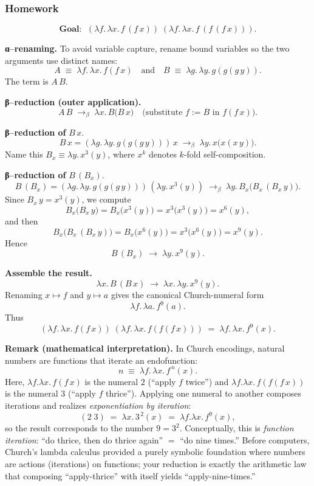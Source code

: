 \documentclass{article}
\theoremstyle{theorem}
\theoremstyle{definition}
\theoremstyle{remark}
\begin{document}
\subsubsection{Homework}

\[
\textbf{Goal: }\;(\lambda f.\,\lambda x.\, f\,(f\,x))\;(\lambda f.\,\lambda x.\, f\,(f\,(f\,x))).
\]

\textbf{α–renaming.}
To avoid variable capture, rename bound variables so the two arguments use distinct names:
\[
A \;\equiv\; \lambda f.\,\lambda x.\, f(f\,x)
\quad\text{and}\quad
B \;\equiv\; \lambda g.\,\lambda y.\, g(g(g\,y)).
\]
The term is \(A\,B\).

\medskip
\textbf{β–reduction (outer application).}
\[
A\,B
\;\to_\beta\;
\lambda x.\, B\bigl(B\,x\bigr)
\quad
\text{(substitute } f := B \text{ in } f(f\,x)).
\]

\medskip
\textbf{β–reduction of } \(B\,x\).
\[
B\,x
=
(\lambda g.\,\lambda y.\, g(g(g\,y)))\,x
\;\to_\beta\;
\lambda y.\, x\bigl(x(x\,y)\bigr).
\]
Name this \(B_x \equiv \lambda y.\, x^3(y)\), where \(x^k\) denotes \(k\)-fold self-composition.

\medskip
\textbf{β–reduction of } \(B\,(B_x)\).
\[
B\,(B_x)
=
(\lambda g.\,\lambda y.\, g(g(g\,y)))\,(\lambda y.\,x^3(y))
\;\to_\beta\;
\lambda y.\, B_x\bigl(B_x\,(B_x\,y)\bigr).
\]
Since \(B_x\,y = x^3(y)\), we compute
\[
B_x\bigl(B_x\,y\bigr) = B_x\bigl(x^3(y)\bigr) = x^3\!\bigl(x^3(y)\bigr) = x^6(y),
\]
and then
\[
B_x\bigl(B_x\,(B_x\,y)\bigr)
= B_x\bigl(x^6(y)\bigr)
= x^3\!\bigl(x^6(y)\bigr)
= x^9(y).
\]
Hence
\[
B\,(B_x) \;\to\; \lambda y.\, x^9(y).
\]

\medskip
\textbf{Assemble the result.}
\[
\lambda x.\, B\,(B\,x)
\;\to\;
\lambda x.\,\lambda y.\, x^9(y).
\]
Renaming \(x\mapsto f\) and \(y\mapsto a\) gives the canonical Church-numeral form
\[
\boxed{\lambda f.\,\lambda a.\, f^9(a)}.
\]
Thus
\[
(\lambda f.\,\lambda x.\, f(f\,x))\;(\lambda f.\,\lambda x.\, f(f(f\,x)))
\;=\;
\lambda f.\,\lambda x.\, f^9(x).
\]

\bigskip
\textbf{Remark (mathematical interpretation).}
In Church encodings, natural numbers are functions that iterate an endofunction:
\[
n \;\equiv\; \lambda f.\,\lambda x.\, f^{\,n}(x).
\]
Here,
\(
\lambda f.\lambda x.\, f(f\,x)
\)
is the numeral \(2\) (“apply \(f\) twice”) and
\(
\lambda f.\lambda x.\, f(f(f\,x))
\)
is the numeral \(3\) (“apply \(f\) thrice”).
Applying one numeral to another composes iterations and realizes \emph{exponentiation by iteration}:
\[
(2\;3) \;=\; \lambda x.\, 3^{\,2}(x) \;=\; \lambda f.\lambda x.\, f^{9}(x),
\]
so the result corresponds to the number \(9 = 3^2\).
Conceptually, this is \emph{function iteration}: “do thrice, then do thrice again” \(=\) “do nine times.”
Before computers, Church’s lambda calculus provided a purely symbolic foundation where numbers are actions (iterations) on functions; your reduction is exactly the arithmetic law that composing “apply-thrice” with itself yields “apply-nine-times.”
\end{document}
